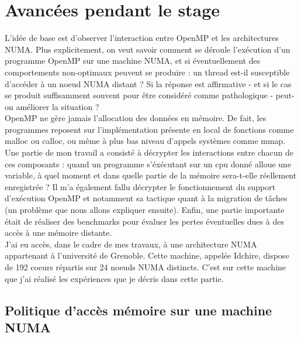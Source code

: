 \documentclass{report}
\begin{document}
\section{Avancées pendant le stage}
L'idée de base est d'observer l'interaction entre OpenMP et les architectures NUMA. Plus explicitement,
on veut savoir comment se déroule l'exécution d'un programme OpenMP sur une machine NUMA, et si 
éventuellement des comportements non-optimaux peuvent se produire : un thread est-il susceptible 
 d'accéder à un noeud NUMA distant ? Si la réponse est affirmative - et si le cas se produit 
suffisamment souvent pour être considéré comme pathologique - peut-on améliorer la situation ?
\\OpenMP ne gère jamais l'allocation des données en mémoire. De fait, les programmes reposent sur 
l'implémentation présente en local de fonctions comme malloc ou calloc, ou même à plus bas niveau
d'appels systèmes comme mmap. Une partie de mon travail a consisté à décrypter les interactions
entre chacun de ces composants : quand un programme s'éxécutant sur un cpu donné alloue une variable,
à quel moment et dans quelle partie de la mémoire sera-t-elle réellement enregistrée ? Il m'a également fallu
décrypter le fonctionnement du support d'exécution OpenMP et notamment sa tactique quant à la migration de
tâches (un problème que nous allons expliquer ensuite). Enfin, une partie importante était de réaliser des 
benchmarks pour évaluer les pertes éventuelles dues à des accès à une mémoire distante. 
\\J'ai eu accès, dans le cadre de mes travaux, à une architecture NUMA appartenant à l'université de 
Grenoble. Cette machine, appelée Idchire, dispose de 192 coeurs répartis sur 24 noeuds NUMA distincts. 
C'est sur cette machine que j'ai réalisé les expériences que je décris dans cette partie.

\subsection{Politique d'accès mémoire sur une machine NUMA}
\end{document}
